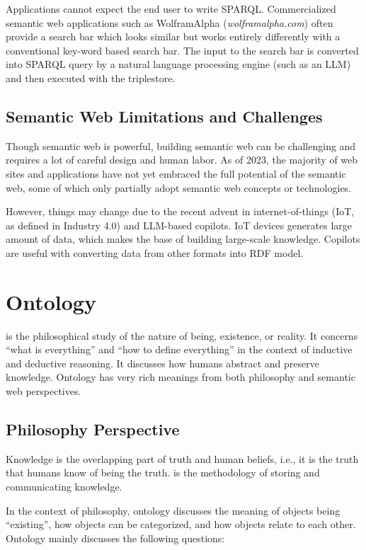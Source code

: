 Applications cannot expect the end user to write SPARQL. Commercialized semantic web applications such as WolframAlpha (\textit{wolframalpha.com}) often provide a search bar which looks similar but works entirely differently with a conventional key-word based search bar. The input to the search bar is converted into SPARQL query by a natural language processing engine (such as an LLM) and then executed with the triplestore.

\subsection{Semantic Web Limitations and Challenges}

Though semantic web is powerful, building semantic web can be challenging and requires a lot of careful design and human labor. As of 2023, the majority of web sites and applications have not yet embraced the full potential of the semantic web, some of which only partially adopt semantic web concepts or technologies.

However, things may change due to the recent advent in internet-of-things (IoT, as defined in Industry 4.0) and LLM-based copilots. IoT devices generates large amount of data, which makes the base of building large-scale knowledge. Copilots are useful with converting data from other formats into RDF model. 

\section{Ontology} \label{sec:ontology}

 is the philosophical study of the nature of being, existence, or reality. It concerns ``what is everything'' and ``how to define everything'' in the context of inductive and deductive reasoning. It discusses how humans abstract and preserve knowledge. Ontology has very rich meanings from both philosophy and semantic web perspectives. 

\subsection{Philosophy Perspective}

Knowledge is the overlapping part of truth and human beliefs, i.e., it is the truth that humans know of being the truth.  is the methodology of storing and communicating knowledge.

In the context of philosophy, ontology discusses the meaning of objects being ``existing'', how objects can be categorized, and how objects relate to each other. Ontology mainly discusses the following questions:

